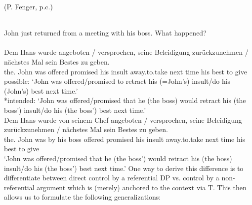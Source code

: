 \documentclass[output=paper]{langsci/langscibook}
\begin{document}
\ea\label{ex:key:23.10}
	\ea\label{ex:key:23.10a}  (P. Fenger, p.c.)\\
    \ex\label{ex:key:23.10b} \\
	\z
\z

\ea\label{ex:key:23.11} John just returned from a meeting with his boss. What happened?\\
    \ea\label{ex:key:23.11a}\\
    \sn
		\gll Dem Hans  wurde  angeboten / versprochen,  seine Beleidigung  zurückzunehmen  /  nächstes Mal  sein Bestes  zu geben.\\
            the.\Dat{} John  was  offered {} promised his insult  away.to.take {}  next time  his best  to give\\
		\glt possible: ‘John was offered/promised to retract his (=John’s) insult/do his (John’s) best next time.’\\
			*intended: ‘John was offered/promised that he (the boss) would retract his (the boss’) insult/do his (the boss’) best next time.’
    \ex\label{ex:key:23.11b} \\
    \sn
		\gll Dem Hans  wurde  von seinem Chef  angeboten / versprochen, seine Beleidigung  zurückzunehmen  /  nächstes Mal  sein Bestes  zu geben.\\
         the.\Dat{} John  was  by his boss  offered {} promised his insult  away.to.take {}  next time  his best  to give\\
		\glt ‘John was offered/promised that he (the boss’) would retract his (the boss) insult/do his (the boss’) best next time.’
	\z
\z
%
One way to derive this difference is to differentiate between direct control by
a referential DP vs. control by a non-referential argument which is (merely)
anchored to the context via T. This then allows us to formulate the following
generalizations:
\end{document}
